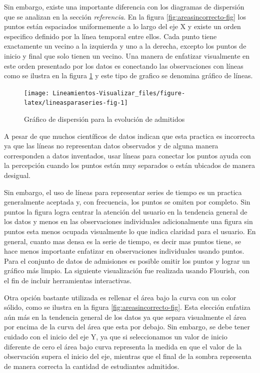 \documentclass[
]{book}
\begin{document}
Sin embargo, existe una importante diferencia con los diagramas de dispersión que se analizan en la sección \emph{referencia}. En la figura \ref{fig:areasincorrecto-fig} los puntos están espaciados uniformemente a lo largo del eje X y existe un orden especifico definido por la línea temporal entre ellos. Cada punto tiene exactamente un vecino a la izquierda y uno a la derecha, excepto los puntos de inicio y final que solo tienen un vecino. Una manera de enfatizar visualmente en este orden presentado por los datos es conectando las observaciones con líneas como se ilustra en la figura \ref{fig:lineasparaseries-fig} y este tipo de grafico se denomina gráfico de líneas.

\begin{figure}

{\centering \texttt{[image: Lineamientos-Visualizar\_files/figure-latex/lineasparaseries-fig-1]} 

}

\caption{Gráfico de dispersión para la evolución de admitidos}\label{fig:lineasparaseries-fig}
\end{figure}

A pesar de que muchos científicos de datos indican que esta practica es incorrecta ya que las líneas no representan datos observados y de alguna manera corresponden a datos inventados, usar líneas para conectar los puntos ayuda con la percepción cuando los puntos están muy separados o están ubicados de manera desigual.

Sin embargo, el uso de líneas para representar series de tiempo es un practica generalmente aceptada y, con frecuencia, los puntos se omiten por completo. Sin puntos la figura logra centrar la atención del usuario en la tendencia general de los datos y menos en las observaciones individuales adicionalmente una figura sin puntos esta menos ocupada visualmente lo que indica claridad para el usuario. En general, cuanto mas densa es la serie de tiempo, es decir mas puntos tiene, se hace menos importante enfatizar en observaciones individuales usando puntos. Para el conjunto de datos de admisiones es posible omitir los puntos y lograr un gráfico más limpio. La siguiente visualización fue realizada usando Flourish, con el fin de incluir herramientas interactivas.

Otra opción bastante utilizada es rellenar el área bajo la curva con un color sólido, como se ilustra en la figura \ref{fig:areasincorrecto-fig}. Esta elección enfatiza aún más en la tendencia general de los datos ya que separa visualmente el área por encima de la curva del área que esta por debajo. Sin embargo, se debe tener cuidado con el inicio del eje Y, ya que si seleccionamos un valor de inicio diferente de cero el área bajo curva representa la medida en que el valor de la observación supera el inicio del eje, mientras que el final de la sombra representa de manera correcta la cantidad de estudiantes admitidos.
\end{document}
